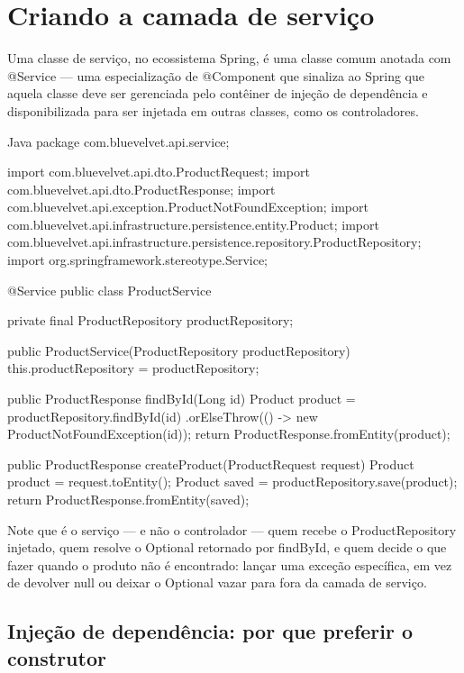\section{Criando a camada de serviço}

Uma classe de serviço, no ecossistema Spring, é uma classe comum anotada com @Service — uma especialização de @Component que sinaliza ao Spring que aquela classe deve ser gerenciada pelo contêiner de injeção de dependência e disponibilizada para ser injetada em outras classes, como os controladores.

\begin{codebox}{Java}
 package com.bluevelvet.api.service;

 import com.bluevelvet.api.dto.ProductRequest;
 import com.bluevelvet.api.dto.ProductResponse;
 import com.bluevelvet.api.exception.ProductNotFoundException;
 import com.bluevelvet.api.infrastructure.persistence.entity.Product;
 import com.bluevelvet.api.infrastructure.persistence.repository.ProductRepository;
 import org.springframework.stereotype.Service;

 @Service
 public class ProductService {

        private final ProductRepository productRepository;

        public ProductService(ProductRepository productRepository) {
            this.productRepository = productRepository;
        }

        public ProductResponse findById(Long id) {
            Product product = productRepository.findById(id)
                    .orElseThrow(() -> new ProductNotFoundException(id));
            return ProductResponse.fromEntity(product);
        }

        public ProductResponse createProduct(ProductRequest request) {
            Product product = request.toEntity();
            Product saved = productRepository.save(product);
            return ProductResponse.fromEntity(saved);
        }
 }
\end{codebox}

Note que é o serviço — e não o controlador — quem recebe o ProductRepository injetado, quem resolve o Optional retornado por findById, e quem decide o que fazer quando o produto não é encontrado: lançar uma exceção específica, em vez de devolver null ou deixar o Optional vazar para fora da camada de serviço.

\subsection{Injeção de dependência: por que preferir o construtor}

